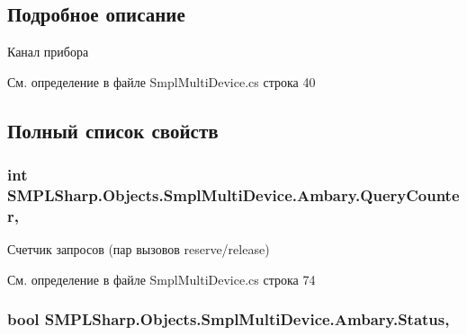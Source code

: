 \subsection{Подробное описание}
Канал прибора 



См. определение в файле Smpl\-Multi\-Device.\-cs строка 40



\subsection{Полный список свойств}
\hypertarget{struct_s_m_p_l_sharp_1_1_objects_1_1_smpl_multi_device_1_1_ambary_a12e73f17080970b2bbc38c3ac17ae550}{
\subsubsection[{Query\-Counter}]{\setlength{\rightskip}{0pt plus 5cm}int S\-M\-P\-L\-Sharp.\-Objects.\-Smpl\-Multi\-Device.\-Ambary.\-Query\-Counter\hspace{0.3cm}{\ttfamily [get]}, {\ttfamily [set]}}}\label{d1/df4/struct_s_m_p_l_sharp_1_1_objects_1_1_smpl_multi_device_1_1_ambary_a12e73f17080970b2bbc38c3ac17ae550}


Счетчик запросов (пар вызовов reserve/release) 



См. определение в файле Smpl\-Multi\-Device.\-cs строка 74

\hypertarget{struct_s_m_p_l_sharp_1_1_objects_1_1_smpl_multi_device_1_1_ambary_ae9cea4ed6bb76111ae7d714c27e2499f}{
\subsubsection[{Status}]{\setlength{\rightskip}{0pt plus 5cm}bool S\-M\-P\-L\-Sharp.\-Objects.\-Smpl\-Multi\-Device.\-Ambary.\-Status\hspace{0.3cm}{\ttfamily [get]}, {\ttfamily [set]}}}\label{d1/df4/struct_s_m_p_l_sharp_1_1_objects_1_1_smpl_multi_device_1_1_ambary_ae9cea4ed6bb76111ae7d714c27e2499f}


